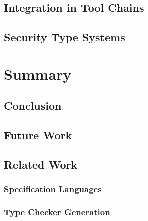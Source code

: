 \documentclass[a4paper,twoside]{report}
\begin{document}
\section{Integration in Tool Chains}
\section{Security Type Systems}

\chapter{Summary}
\section{Conclusion}
\section{Future Work}
\section{Related Work}
\subsection{Specification Languages}
\subsection{Type Checker Generation}


\end{document}

